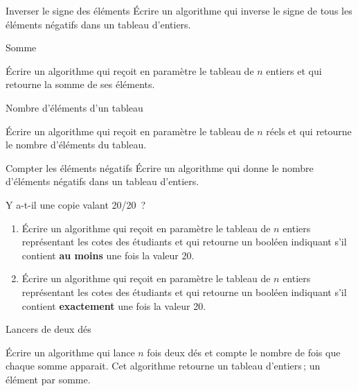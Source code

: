 	\begin{Exercice}{Inverser le signe des éléments}
		Écrire un algorithme qui 
		inverse le signe de tous les éléments négatifs dans un tableau d’entiers.
	\end{Exercice}

	\begin{Exercice}{Somme}

		Écrire un algorithme qui reçoit en paramètre le tableau 
		de $n$ entiers et qui retourne la somme de ses éléments.
	
	\end{Exercice}

	\begin{Exercice}{Nombre d’éléments d’un tableau}
		
		Écrire un algorithme qui reçoit en paramètre le tableau  de
		$n$ réels et qui retourne le nombre d’éléments du tableau.
	
	\end{Exercice}

	\begin{Exercice}{Compter les éléments négatifs}
		Écrire un algorithme qui
		donne le nombre d’éléments négatifs dans un tableau d’entiers.
	\end{Exercice}


	\begin{Exercice}{Y a-t-il une copie valant 20/20~?}
		\begin{enumerate}
			
			\item Écrire un algorithme qui reçoit en paramètre le tableau
				 de $n$ entiers représentant les cotes des étudiants
				et qui retourne un booléen indiquant s’il contient \textbf{au
				moins} une fois la valeur 20. 

			\item Écrire un algorithme qui reçoit en paramètre le tableau
				 de $n$ entiers représentant les cotes des étudiants
				et qui retourne un booléen indiquant s’il contient
				\textbf{exactement} une fois la valeur 20.  
		
		\end{enumerate}
	
	\end{Exercice}

	\begin{Exercice}{Lancers de deux dés}

		Écrire un algorithme qui lance $n$ fois deux dés et compte le nombre de
		fois que chaque somme apparait. Cet algorithme retourne un tableau
		d'entiers\,; un élément par somme. 

	\end{Exercice}

